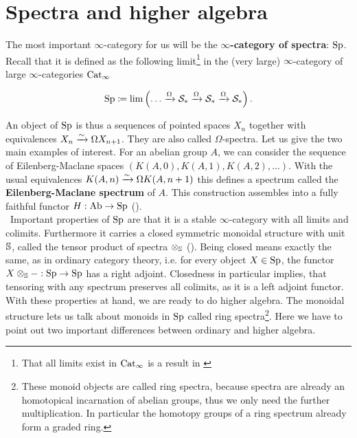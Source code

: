 \section{Spectra and higher algebra}
The most important $\infty$-category for us will be the\textbf{ $\infty$-category of spectra}: $\Sp$. Recall that it is defined as the following limit\footnote{That all limits exist in $\Cat_\infty$ is a result in \cite[Section~3.3.3]{HigherToposTheory}} in the (very large) $\infty$-category of large $\infty$-categories $\Cat_\infty$

\begin{equation*}
    \Sp\coloneqq \lim\left( \dots\xrightarrow{\Omega}\Spc_* \xrightarrow{\Omega} \Spc_* \xrightarrow{\Omega}\Spc_* \right).
\end{equation*}

An object of $\Sp$ is thus a sequences of pointed spaces $X_n$ together with equivalences $X_n\rai \Omega X_{n+1}$. They are also called $\Omega$-spectra. Let us give the two main examples of interest. For an abelian group $A$, we can consider the sequence of Eilenberg-Maclane spaces $\left( K(A,0), K(A,1), K(A,2),\dots \right)$. With the usual equivalences $K(A,n)\rai \Omega K(A,n+1)$ this defines a spectrum called the \textbf{Eilenberg-Maclane spectrum }of $A$. This construction assembles into a fully faithful functor $H:\Ab\ra \Sp$ (\cite[Example~1.3.3.5]{lurie2017higher}). 
\\\
Important properties of $\Sp$ are that it is a stable $\infty$-category with all limits and colimits. Furthermore it carries a closed symmetric monoidal structure with unit $\S$, called the tensor product of spectra $\otimes_\S$ (\cite[Corollary~4.8.2.19]{lurie2017higher}). Being closed means exactly the same, as in ordinary category theory, i.e. for every object $X\in \Sp$, the functor $X\otimes_\S-:\Sp\to \Sp $ has a right adjoint. 
Closedness in particular implies, that tensoring with any spectrum preserves all colimits, as it is a left adjoint functor. \\
With these properties at hand, we are ready to do higher algebra.
The monoidal structure lets us talk about monoids in $\Sp$ called ring spectra\footnote{These monoid objects are called ring spectra, because spectra are already an homotopical incarnation of abelian groups, thus we only need the further multiplication. In particular the homotopy groups of a ring spectrum already form a graded ring.}. Here we have to point out two important differences between ordinary and higher algebra. 
